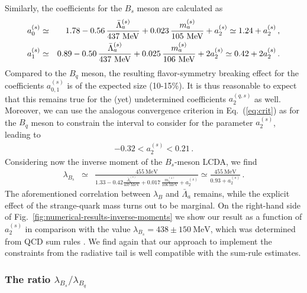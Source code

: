 \documentclass[a4paper,11pt]{article}
\begin{document}
Similarly, the coefficients for the $B_s$ meson are calculated as
\begin{eqnarray}
    a^{(s)}_0 &\simeq& 1.78
        - 0.56 \, \frac{\bar\Lambda_a^{(s)}}{437~\mathrm{MeV}}
        + 0.023 \, \frac{m_a^{(s)}}{105~\mathrm{MeV}}
        + a^{(s)}_2
        \simeq 1.24 + a^{(s)}_2 \,,\cr
    a^{(s)}_1 &\simeq& 0.89
        - 0.50 \, \frac{\bar\Lambda_a^{(s)}}{437~\mathrm{MeV}}
        + 0.025 \, \frac{m_a^{(s)}}{106~\mathrm{MeV}}
        + 2 a^{(s)}_2
        \simeq 0.42 + 2 a^{(s)}_2
        \,.
\end{eqnarray}
Compared to the $B_q$ meson, the resulting flavor-symmetry breaking effect
for the coefficients $a_{0,1}^{(s)}$ is of the expected size (10-15\%).
It is thus reasonable to expect that this remains true for the 
(yet) undetermined coefficients $a_2^{(q,s)}$ as well.
%
Moreover, we can use the analogous convergence criterion in Eq.~(\ref{eq:crit}) as for the $B_q$ meson 
to constrain the interval to consider for the parameter $a_2^{(s)}$,
leading to 
\begin{eqnarray}
    -0.32 < a^{(s)}_2 < 0.21 \,.
    \label{eq:crits}
\end{eqnarray}
%
Considering now the inverse moment of the $B_s$-meson LCDA, we find
\begin{eqnarray}
    \lambda_{B_s} &\simeq&
        \frac{455~\mathrm{MeV}}{
            1.33 
            - 0.42 \frac{\bar\Lambda_a^{(s)}}{437~\mathrm{MeV}}
            + 0.017 \, \frac{m_a^{(s)}}{106~\mathrm{MeV}}
            + a^{(s)}_2
            }
        \simeq \frac{455~\mathrm{MeV}}{0.93 + a^{(s)}_2} \,.
\end{eqnarray}
The aforementioned correlation between $\lambda_B$ and $\bar \Lambda_a$ remains, while 
the explicit effect of the strange-quark mass turns out to be marginal.
On the right-hand side of Fig.~\ref{fig:numerical-results-inverse-moments} we show our result 
as a function of $a_2^{(s)}$ in comparison with the value $\lambda_{B_s} = 438 \pm 150~\mathrm{MeV}$,
which was determined from QCD sum rules \cite{Khodjamirian:2020hob}.
We find again that our approach to implement the constraints from the radiative tail is well compatible with the 
sum-rule estimates.



\subsubsection*{The ratio $\lambda_{B_s}/\lambda_{B_q}$}
\end{document}
